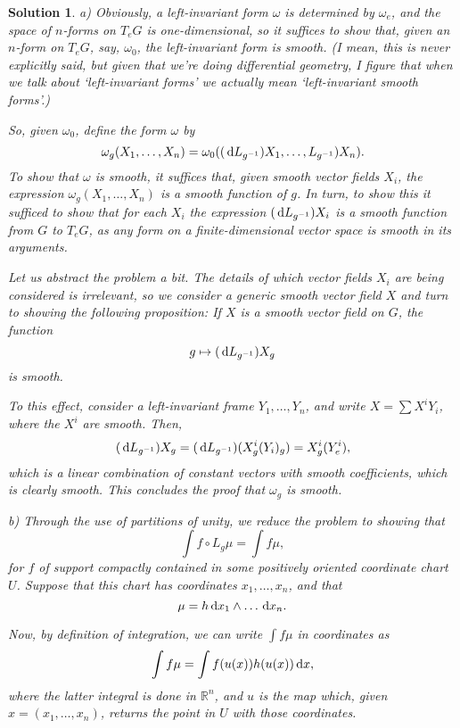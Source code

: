 \documentclass{article}
\theoremstyle{nonumberplain}
\newtheorem{sol}{Solution}
\newcommand{\R}{\mathbb{R}}
\begin{document}
\begin{sol}
a) Obviously, a left-invariant form $\omega$ is determined by $\omega_e$, and the space of $n$-forms on $T_e G$ is one-dimensional, so it suffices to show that, given an $n$-form on $T_e G$, say, $\omega_0$, the left-invariant form is smooth. (I mean, this is never explicitly said, but given that we're doing \emph{differential} geometry, I figure that when we talk about `left-invariant forms' we actually mean `left-invariant \emph{smooth} forms'.)

So, given $\omega_0$, define the form $\omega$ by
\[\omega_g (X_1, \dots, X_n) = \omega_0((\dl L_{g^{-1}}) X_1, \dots, L_{g^{-1}}) X_n).\]
To show that $\omega$ is smooth, it suffices that, given smooth vector fields $X_i$, the expression $\omega_g (X_1, \dots, X_n)$ is a smooth function of $g$. In turn, to show this it sufficed to show that for each $X_i$ the expression $(\dl L_{g^{-1}}) X_i$ is a smooth function from $G$ to $T_e G$, as any form on a finite-dimensional vector space is smooth in its arguments.

Let us abstract the problem a bit. The details of which vector fields $X_i$ are being considered is irrelevant, so we consider a generic smooth vector field $X$ and turn to showing the following proposition: If $X$ is a smooth vector field on $G$, the function
\[g \mapsto (\dl L_{g^{-1}}) X_g\]
is smooth.

To this effect, consider a left-invariant frame $Y_1, \dots, Y_n$, and write $X = \sum X^i Y_i$, where the $X^i$ are smooth. Then,
\[(\dl L_{g^{-1}}) X_g = (\dl L_{g^{-1}}) (X^i_g (Y_i)_g) = X^i_g (Y^i_e),\]
which is a linear combination of constant vectors with smooth coefficients, which is clearly smooth. This concludes the proof that $\omega_g$ is smooth.

\medskip

b) Through the use of partitions of unity, we reduce the problem to showing that
\[\int f \circ L_g \mu = \int f \mu,\]
for $f$ of support compactly contained in some \emph{positively oriented} coordinate chart $U$. Suppose that this chart has coordinates $x_1, \dots, x_n$, and that
\[ \mu = h \dl x_1 \wedge \dots \dl x_n.\]

Now, by definition of integration, we can write $\int f \mu$ in coordinates as
\begin{equation}\label{fuhu}
\int f \mu = \int f(u(x)) h(u(x)) \dl x,
\end{equation}
where the latter integral is done in $\R^n$, and $u$ is the map which, given $x = (x_1, \dots, x_n)$, returns the point in $U$ with those coordinates.


\end{sol}
\end{document}
